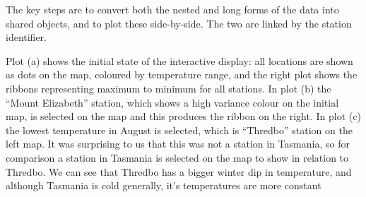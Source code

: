 \documentclass[
  shortnames]{jss}
\newenvironment{Shaded}{\begin{snugshade}}{\end{snugshade}}
\newcommand{\AttributeTok}[1]{\textcolor[rgb]{0.77,0.63,0.00}{#1}}
\newcommand{\FunctionTok}[1]{\textcolor[rgb]{0.00,0.00,0.00}{#1}}
\newcommand{\NormalTok}[1]{#1}
\newcommand{\OtherTok}[1]{\textcolor[rgb]{0.56,0.35,0.01}{#1}}
\newcommand{\SpecialCharTok}[1]{\textcolor[rgb]{0.00,0.00,0.00}{#1}}
\newcommand{\StringTok}[1]{\textcolor[rgb]{0.31,0.60,0.02}{#1}}
\begin{document}
The key steps are to convert both the nested and long forms of the data into shared  objects, and to plot these side-by-side. The two are linked by the station identifier.

\begin{Shaded}
\end{Shaded}

Plot (a) shows the initial state of the interactive display: all locations are shown as dots on the map, coloured by temperature range, and the right plot shows the ribbons representing maximum to minimum for all stations. In plot (b) the ``Mount Elizabeth'' station, which shows a high variance colour on the initial map, is selected on the map and this produces the ribbon on the right. In plot (c) the lowest temperature in August is selected, which is ``Thredbo'' station on the left map. It was surprising to us that this was not a station in Tasmania, so for comparison a station in Tasmania is selected on the map to show in relation to Thredbo. We can see that Thredbo has a bigger winter dip in temperature, and although Tasmania is cold generally, it's temperatures are more constant
\end{document}
